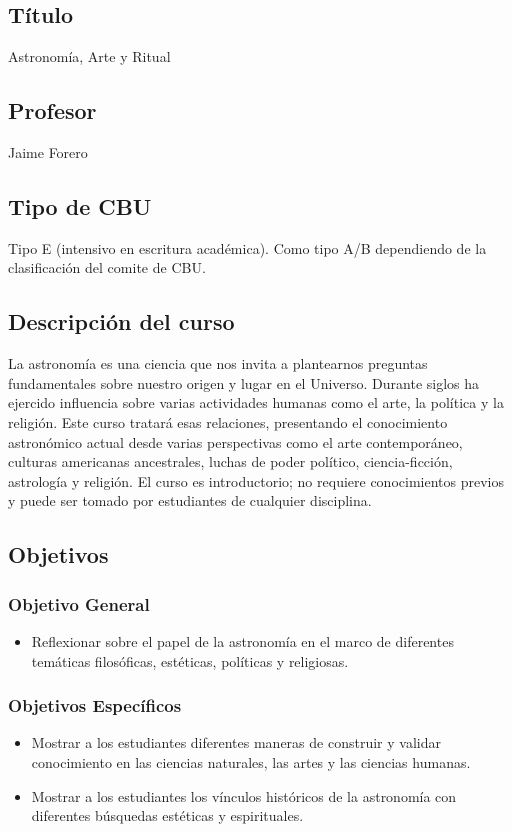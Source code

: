 \documentclass{report}
\begin{document}
\subsection*{\bf T\'itulo}
Astronom\'ia, Arte y Ritual\\

\subsection*{\bf Profesor}
Jaime Forero\\

\subsection*{Tipo de CBU}
Tipo E (intensivo en escritura acad\'emica). Como tipo
A/B dependiendo de la clasificaci\'on del comite de CBU.  

\subsection*{Descripci\'on del curso}
La astronom\'ia es una ciencia que nos invita a plantearnos preguntas
fundamentales sobre nuestro origen y lugar en el Universo. Durante
siglos ha ejercido influencia sobre varias actividades humanas como el arte, la
pol\'itica y la religi\'on. Este curso tratar\'a esas relaciones,
presentando el conocimiento astron\'omico actual desde varias
perspectivas como el arte contempor\'aneo, culturas americanas
ancestrales, luchas de poder pol\'itico, ciencia-ficci\'on,
astrolog\'ia y religi\'on. El curso es introductorio; no requiere
conocimientos previos y puede ser tomado por estudiantes de cualquier
disciplina. 
\subsection*{Objetivos}

\subsubsection*{Objetivo General}
\begin{itemize}
\item Reflexionar sobre el papel de la astronom\'ia en el marco de 
  diferentes tem\'aticas filos\'oficas, est\'eticas, pol\'iticas y
  religiosas.
\end{itemize}

\subsubsection*{Objetivos Espec\'ificos}
\begin{itemize}
\item Mostrar a los estudiantes diferentes maneras de construir
  y validar conocimiento en las ciencias naturales, las artes y las
  ciencias humanas. 
\item Mostrar a los estudiantes los v\'inculos hist\'oricos de la
  astronom\'ia con diferentes b\'usquedas est\'eticas y espirituales.  
\end{itemize}
\end{document}
